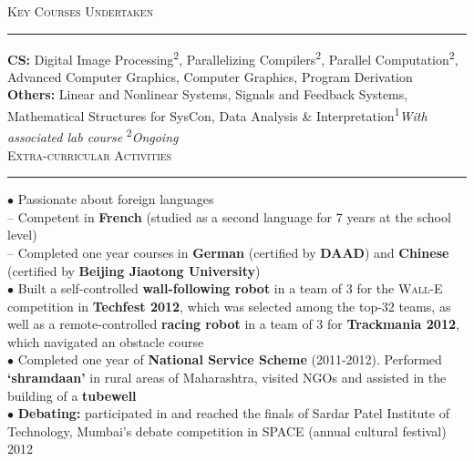 \documentclass[a4paper,9pt]{article}
\begin{document}

\Large{\textsc{Key Courses Undertaken}}\vspace{1.5pt}
\hrule\vspace{0.25cm}
\small
\textbf{CS:} Digital Image Processing\textsuperscript{2}, Parallelizing Compilers\textsuperscript{2}, Parallel Computation\textsuperscript{2}, Advanced Computer Graphics, Computer Graphics, Program Derivation\\
\textbf{Others:} Linear and Nonlinear Systems, Signals and Feedback Systems, Mathematical Structures for SysCon, Data Analysis \& Interpretation\hfill\textsuperscript{1}\emph{With associated lab course} \textsuperscript{2}\emph{Ongoing}\\

\Large{\textsc{Extra-curricular Activities}}\vspace{1.5pt}
\hrule\vspace{0.25cm}
\small
$\bullet$ Passionate about foreign languages\\
-- Competent in \textbf{French} (studied as a second language for 7 years at the school level)\\
-- Completed one year courses in \textbf{German} (certified by \textbf{DAAD}) and \textbf{Chinese} (certified by \textbf{Beijing Jiaotong University})\\
$\bullet$ Built a self-controlled \textbf{wall-following robot} in a team of 3 for the \textsc{Wall-E} competition in \textbf{Techfest 2012}, which was selected among the top-32 teams, as well as a remote-controlled \textbf{racing robot} in a team of 3 for \textbf{Trackmania 2012}, which navigated an obstacle course\\
$\bullet$ Completed one year of \textbf{National Service Scheme} (2011-2012). Performed \textbf{‘shramdaan’} in rural areas of Maharashtra, visited NGOs and assisted in the building of a \textbf{tubewell}\\
$\bullet$ \textbf{Debating:} participated in and reached the finals of Sardar Patel Institute of Technology, Mumbai's debate competition in SPACE (annual cultural festival) 2012\\
\end{document}
